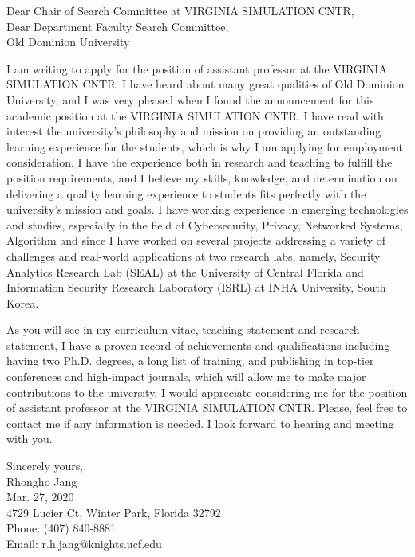 \documentclass[11pt,letter]{article}
\newcommand{\univ}{Old Dominion University}
\newcommand{\dept}{VIRGINIA SIMULATION CNTR}
\begin{document}
\thispagestyle{empty}
\noindent Dear Chair of Search Committee at \dept,\\
Dear Department Faculty Search Committee,\\
\univ\\
\vspace{10mm}

I am writing to apply for the position of assistant professor at the \dept. 
I have heard about many great qualities of \univ, and I was very pleased when I found the announcement for this academic position at the \dept.  
I have read with interest the university’s philosophy and mission on providing an outstanding learning experience for the students, which is why I am applying for employment consideration.  
I have the experience both in research and teaching to fulfill the position requirements, and I believe my skills, knowledge, and determination on delivering a quality learning experience to students fits perfectly with the university’s mission and goals. 
I have working experience in emerging technologies and studies, especially in the field of Cybersecurity, Privacy, Networked Systems, Algorithm and since I have worked on several projects addressing a variety of challenges and real-world applications at two research labs, namely, Security Analytics Research Lab (SEAL) at the University of Central Florida and Information Security Research Laboratory (ISRL) at INHA University, South Korea.

As you will see in my curriculum vitae, teaching statement and research statement, I have a proven record of achievements and qualifications including having two Ph.D. degrees, a long list of training, and publishing in top-tier conferences and high-impact journals, which will allow me to make major contributions to the university. I would appreciate considering me for the position of assistant professor at the \dept. Please, feel free to contact me if any information is needed. I look forward to hearing and meeting with you.

\vspace{10mm}

\noindent
Sincerely yours,\\
Rhongho Jang\\
Mar. 27, 2020\\
4729 Lucier Ct, Winter Park, Florida 32792\\
Phone: (407) 840-8881\\
Email: r.h.jang@knights.ucf.edu\\
\end{document}

